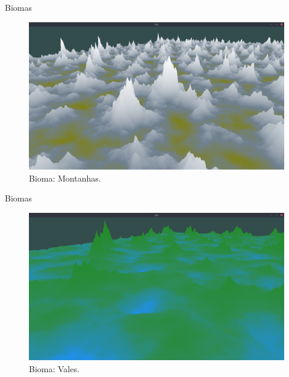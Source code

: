 \begin{frame}{Biomas}
    \begin{figure}[H]
        \centering
        \includegraphics[width=.9\textwidth]{img/biomas/bssMontains.png}
        \caption{Bioma: Montanhas.}
        \label{fig:img_biomas_bssMontains}
    \end{figure}
    
    
\end{frame}

\begin{frame}{Biomas}
    \begin{figure}[H]
        \centering
        \includegraphics[width=.9\textwidth]{img/biomas/bssValley.png}
        \caption{Bioma: Vales.}
        \label{fig:img_biomas_bssValley}
    \end{figure}
    
    
\end{frame}

